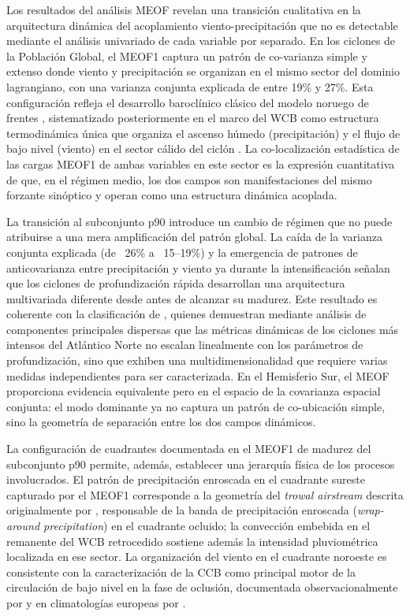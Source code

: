 Los resultados del análisis MEOF revelan una transición cualitativa en la arquitectura dinámica del acoplamiento viento-precipitación que no es detectable mediante el análisis univariado de cada variable por separado. 
En los ciclones de la Población Global, el MEOF1 captura un patrón de co-varianza simple y extenso donde viento y precipitación se organizan en el mismo sector del dominio lagrangiano, con una varianza conjunta explicada de entre 19\% y 27\%. 
Esta configuración refleja el desarrollo baroclínico clásico del modelo noruego de frentes \citep{bjerknes1922life}, sistematizado posteriormente en el marco del WCB como estructura termodinámica única que organiza el ascenso húmedo (precipitación) y el flujo de bajo nivel (viento) en el sector cálido del ciclón \citep{browning1986conceptual}. 
La co-localización estadística de las cargas MEOF1 de ambas variables en este sector es la expresión cuantitativa de que, en el régimen medio, los dos campos son manifestaciones del mismo forzante sinóptico y operan como una estructura dinámica acoplada.

La transición al subconjunto p90 introduce un cambio de régimen que no puede atribuirse a una mera amplificación del patrón global. 
La caída de la varianza conjunta explicada (de ~26\% a ~15--19\%) y la emergencia de patrones de anticovarianza entre precipitación y viento ya durante la intensificación señalan que los ciclones de profundización rápida desarrollan una arquitectura multivariada diferente desde antes de alcanzar su madurez.
Este resultado es coherente con la clasificación de \citet{corner2025classification}, quienes demuestran mediante análisis de componentes principales dispersas que las métricas dinámicas de los ciclones más intensos del Atlántico Norte no escalan linealmente con los parámetros de profundización, sino que exhiben una multidimensionalidad que requiere varias medidas independientes para ser caracterizada.
En el Hemisferio Sur, el MEOF proporciona evidencia equivalente pero en el espacio de la covarianza espacial conjunta: el modo dominante ya no captura un patrón de co-ubicación simple, sino la geometría de separación entre los dos campos dinámicos.

La configuración de cuadrantes documentada en el MEOF1 de madurez del subconjunto p90 permite, además, establecer una jerarquía física de los procesos involucrados.
El patrón de precipitación enroscada en el cuadrante sureste capturado por el MEOF1 corresponde a la geometría del \textit{trowal airstream} descrita originalmente por \citet{martin1999forcing}, responsable de la banda de precipitación enroscada (\textit{wrap-around precipitation}) en el cuadrante ocluido; la convección embebida en el remanente del WCB retrocedido \citep{oertel2021warm} sostiene además la intensidad pluviométrica localizada en ese sector.
La organización del viento en el cuadrante noroeste es consistente con la caracterización de la CCB como principal motor de la circulación de bajo nivel en la fase de oclusión, documentada observacionalmente por \citet{martinez2014cold} y en climatologías europeas por \citet{eisenstein2023identification}.

